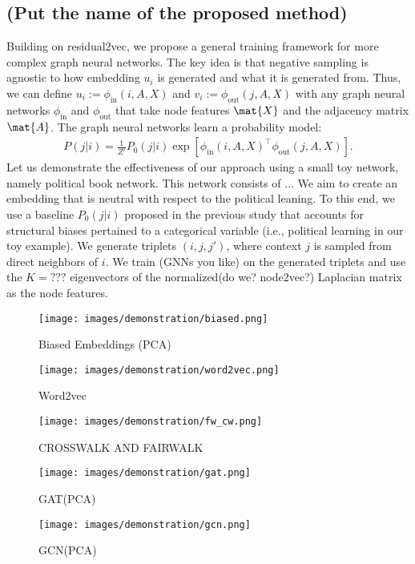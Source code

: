 \documentclass[sigconf,authordraft]{acmart}
\begin{document}
\subsection{(Put the name of the proposed method)}

Building on residual2vec, we propose a general training framework for more complex graph neural networks. The key idea is that negative sampling is agnostic to how embedding $u_i$ is generated and what it is generated from. Thus, we can define $u_i:=\phi_{\text{in}}(i, A, X)$ and $v_i:=\phi_{\text{out}}(j, A, X)$ with any graph neural networks $\phi_{\text{in}}$ and $\phi_{\text{out}}$ that take node features $\mat{X}$ and the adjacency matrix $\mat{A}$. The graph neural networks learn a probability model:
\begin{align}
P(j \vert i) = \frac{1}{Z'}P_0(j\vert i)\exp\left[\phi_{\text{in}}(i, A, X) ^\top \phi_{\text{out}}(j, A, X)\right]. \label{eq:proposed}
\end{align}
Let us demonstrate the effectiveness of our approach using a small toy network, namely political book network.
This network consists of ... 
We aim to create an embedding that is neutral with respect to the political leaning. To this end, we use a baseline $P_0(j\vert i)$ proposed in the previous study \cite{kojaku_residual2vec_2021} that accounts for structural biases pertained to a categorical variable (i.e., political learning in our toy example).
We generate triplets $(i,j,j')$, where context $j$ is sampled from direct neighbors of $i$.
We train (GNNs you like) on the generated triplets and use the $K=???$ eigenvectors of the normalized(do we? node2vec?) Laplacian matrix as the node features.

\begin{figure}[h]
  \centering
  \texttt{[image: images/demonstration/biased.png]}
  \caption{Biased Embeddings (PCA)}
\end{figure}

\begin{figure}[h]
  \centering
  \texttt{[image: images/demonstration/word2vec.png]}
  \caption{Word2vec }
\end{figure}


\begin{figure*}
  \texttt{[image: images/demonstration/fw\_cw.png]}
\caption{CROSSWALK AND FAIRWALK}

\end{figure*}
\begin{figure*}
  \texttt{[image: images/demonstration/gat.png]}
\caption{GAT(PCA)}

\end{figure*}
\begin{figure*}
  \texttt{[image: images/demonstration/gcn.png]}
\caption{GCN(PCA)}

\end{figure*}
\end{document}
